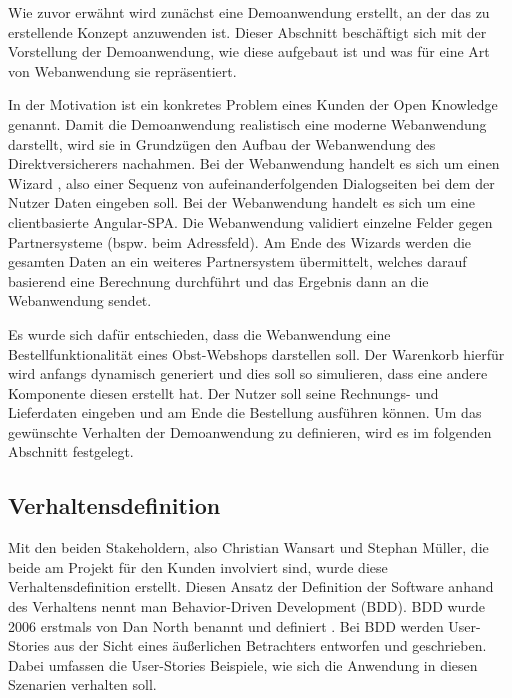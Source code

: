 
Wie zuvor erwähnt wird zunächst eine Demoanwendung erstellt, an der das zu erstellende Konzept anzuwenden ist. Dieser Abschnitt beschäftigt sich mit der Vorstellung der Demoanwendung, wie diese aufgebaut ist und was für eine Art von Webanwendung sie repräsentiert.

In der Motivation ist ein konkretes Problem eines Kunden der Open Knowledge genannt. Damit die Demoanwendung realistisch eine moderne Webanwendung \cite{RichWebBasedApplications} darstellt, wird sie in Grundzügen den Aufbau der Webanwendung des Direktversicherers nachahmen. Bei der Webanwendung handelt es sich um einen Wizard \cite{EzMolAWebServerWizard}, also einer Sequenz von aufeinanderfolgenden Dialogseiten bei dem der Nutzer Daten eingeben soll. Bei der Webanwendung handelt es sich um eine clientbasierte Angular-SPA. Die Webanwendung validiert einzelne Felder gegen Partnersysteme (bspw. beim Adressfeld). Am Ende des Wizards werden die gesamten Daten an ein weiteres Partnersystem übermittelt, welches darauf basierend eine Berechnung durchführt und das Ergebnis dann an die Webanwendung sendet.

Es wurde sich dafür entschieden, dass die Webanwendung eine Bestellfunktionalität eines Obst-Webshops darstellen soll. Der Warenkorb hierfür wird anfangs dynamisch generiert und dies soll so simulieren, dass eine andere Komponente diesen erstellt hat. Der Nutzer soll seine Rechnungs- und Lieferdaten eingeben und am Ende die Bestellung ausführen können. Um das gewünschte Verhalten der Demoanwendung zu definieren, wird es im folgenden Abschnitt festgelegt.

\subsection{Verhaltensdefinition}

Mit den beiden Stakeholdern, also Christian Wansart und Stephan Müller, die beide am Projekt für den Kunden involviert sind, wurde diese Verhaltensdefinition erstellt. Diesen Ansatz der Definition der Software anhand des Verhaltens nennt man Behavior-Driven Development (BDD). BDD wurde 2006 erstmals von Dan North benannt und definiert \cite{IntroducingBDD}. Bei BDD werden User-Stories aus der Sicht eines äußerlichen Betrachters entworfen und geschrieben. Dabei umfassen die User-Stories Beispiele, wie sich die Anwendung in diesen Szenarien verhalten soll.

